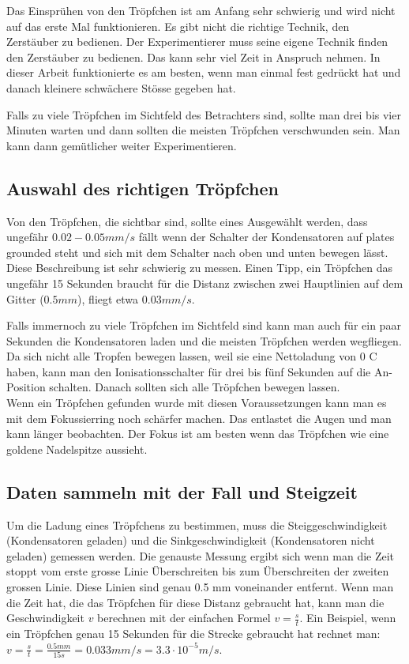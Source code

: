 Das Einsprühen von den Tröpfchen ist am Anfang sehr schwierig und wird nicht auf das erste Mal funktionieren. Es gibt nicht die richtige Technik, den Zerstäuber zu bedienen. Der Experimentierer muss seine eigene Technik finden den Zerstäuber zu bedienen. Das kann sehr viel Zeit in Anspruch nehmen. In dieser Arbeit funktionierte es am besten, wenn man einmal fest gedrückt hat und danach kleinere schwächere Stösse gegeben hat.

Falls zu viele Tröpfchen im Sichtfeld des Betrachters sind, sollte man drei bis vier Minuten warten und dann sollten die meisten Tröpfchen verschwunden sein. Man kann dann gemütlicher weiter Experimentieren.

\subsection{Auswahl des richtigen Tröpfchen}\label{sub:auswahlTropfen}
Von den Tröpfchen, die sichtbar sind, sollte eines Ausgewählt werden, dass ungefähr $0.02 - 0.05 mm/s$ fällt wenn der Schalter der Kondensatoren auf plates grounded steht und sich mit dem Schalter nach oben und unten bewegen lässt. Diese Beschreibung ist sehr schwierig zu messen. Einen Tipp, ein Tröpfchen das ungefähr 15 Sekunden braucht für die Distanz zwischen zwei Hauptlinien auf dem Gitter ($0.5mm$), fliegt etwa $0.03 mm/s$. 

Falls immernoch zu viele Tröpfchen im Sichtfeld sind kann man auch für ein paar Sekunden die Kondensatoren laden und die meisten Tröpfchen werden wegfliegen. Da sich nicht alle Tropfen bewegen lassen, weil sie eine Nettoladung von 0 C haben, kann man den Ionisationsschalter für drei bis fünf Sekunden auf die An-Position schalten. Danach sollten sich alle Tröpfchen bewegen lassen. \\

Wenn ein Tröpfchen gefunden wurde mit diesen Voraussetzungen kann man es mit dem Fokussierring noch schärfer machen. Das entlastet die Augen und man kann länger beobachten. Der Fokus ist am besten wenn das Tröpfchen wie eine goldene Nadelspitze aussieht.

\subsection{Daten sammeln mit der Fall und Steigzeit}\label{sub:datenFallundSteig}
Um die Ladung eines Tröpfchens zu bestimmen, muss die Steiggeschwindigkeit (Kondensatoren geladen) und die Sinkgeschwindigkeit (Kondensatoren nicht geladen) gemessen werden. Die genauste Messung ergibt sich wenn man die Zeit stoppt vom erste grosse Linie Überschreiten bis zum Überschreiten der zweiten grossen Linie. Diese Linien sind genau 0.5 mm voneinander entfernt. Wenn man die Zeit hat, die das Tröpfchen für diese Distanz gebraucht hat, kann man die Geschwindigkeit $v$ berechnen mit der einfachen Formel $v = \frac{s}{t}$. Ein Beispiel, wenn ein Tröpfchen genau 15 Sekunden für die Strecke gebraucht hat rechnet man: $v = \frac{s}{t} = \frac{0.5mm}{15s} = 0.033 mm/s = 3.3 \cdot 10^{-5} m/s$. 

